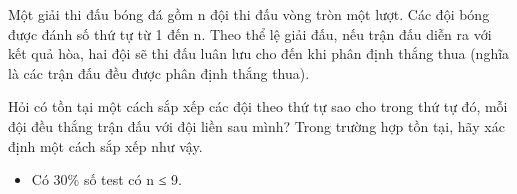 Một giải thi đấu bóng đá gồm n đội thi đấu vòng tròn một lượt. Các đội bóng được đánh số thứ tự từ 1 đến n. Theo thể lệ giải đấu, nếu trận đấu diễn ra với kết quả hòa, hai đội sẽ thi đấu luân lưu cho đến khi phân định thắng thua (nghĩa là các trận đấu đều được phân định thắng thua).

Hỏi có tồn tại một cách sắp xếp các đội theo thứ tự sao cho trong thứ tự đó, mỗi đội đều thắng trận đấu với đội liền sau mình? Trong trường hợp tồn tại, hãy xác định một cách sắp xếp như vậy.
\begin{itemize}
	\item Có 30\% số test có n ≤ 9.
\end{itemize}